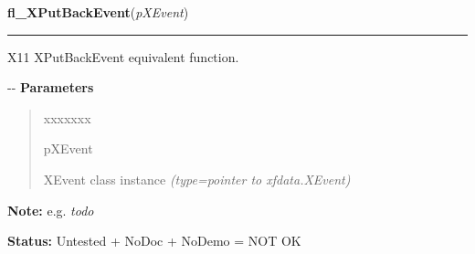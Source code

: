 \hspace{.8\funcindent}\begin{boxedminipage}{\funcwidth}

    \raggedright \textbf{fl\_XPutBackEvent}(\textit{pXEvent})

    \vspace{-1.5ex}

    \rule{\textwidth}{0.5\fboxrule}
\setlength{\parskip}{2ex}

X11 XPutBackEvent equivalent function.

-{}-
\setlength{\parskip}{1ex}
      \textbf{Parameters}
      \vspace{-1ex}

      \begin{quote}
        \begin{Ventry}{xxxxxxx}

          \item[pXEvent]


XEvent class instance
            {\it (type=pointer to xfdata.XEvent)}

        \end{Ventry}

      \end{quote}

\textbf{Note:} 
e.g. \emph{todo}


\textbf{Status:} 
Untested + NoDoc + NoDemo = NOT OK


    \end{boxedminipage}

    \label{xformslib:flxbasic:fl_last_event}

    \vspace{0.5ex}

